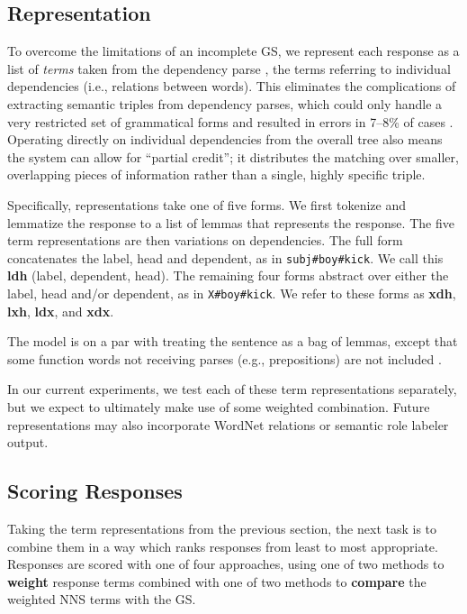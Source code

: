 \subsection{Representation}
\label{sec:representation}

To overcome the limitations of an incomplete GS, we represent each
response as a list of \textit{terms} taken from the dependency parse
\citep{demarneffe:ea:06}, the terms referring to
individual dependencies (i.e., relations between words).
This eliminates the complications of extracting semantic triples from
dependency parses, which could only handle a very restricted set of
grammatical forms and resulted in errors in 7--8\% of cases
\citep{king:dickinson:13}. Operating directly on individual
dependencies from the overall tree also means the system can allow for
``partial credit''; it distributes the matching over smaller,
overlapping pieces of information rather than a single, highly
specific triple.

Specifically, representations take one of five forms.  We first
tokenize and lemmatize the response to a list of lemmas that
represents the response.
The five term representations are then variations on dependencies. The
full form concatenates the label, head and dependent, as in
\texttt{subj\#boy\#kick}. We call this \textbf{ldh} (label, dependent,
head). The remaining four forms abstract over either the label, head
and/or dependent, as in \texttt{X\#boy\#kick}. We refer to these forms
as \textbf{xdh}, \textbf{lxh}, \textbf{ldx}, and \textbf{xdx}. 

The  model is on a par with treating the sentence as a bag
of lemmas, except that some function words not receiving parses (e.g.,
prepositions) are not included \citep[see][]{king:dickinson:13}.

In our current experiments, we test each of these term representations
separately, but we expect to ultimately make use of some weighted
combination. Future representations may also incorporate WordNet
relations or semantic role labeler output.

\subsection{Scoring Responses}
\label{sec:scoring}

Taking the term representations from the previous section, the next
task is to combine them in a way which ranks responses from least to
most appropriate.  Responses are scored with one of four approaches,
using one of two methods to \textbf{weight} response terms combined
with one of two methods to \textbf{compare} the weighted NNS terms
with the GS.

